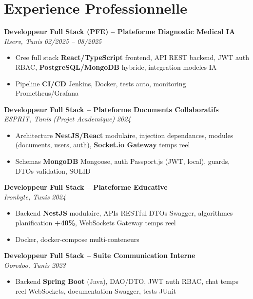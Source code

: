 \documentclass[10pt,a4paper]{article}
\begin{document}
\section*{Experience Professionnelle}
{\small

\textbf{Developpeur Full Stack (PFE) -- Plateforme Diagnostic Medical IA}\\[1pt]
\textit{Itserv, Tunis} \hfill \textit{02/2025 -- 08/2025}
\begin{itemize}[leftmargin=12pt,itemsep=2pt,topsep=3pt,parsep=0pt]
  \item Cree full stack \textbf{React/TypeScript} frontend, API REST backend, JWT auth RBAC, \textbf{PostgreSQL/MongoDB} hybride, integration modeles IA
  \item Pipeline \textbf{CI/CD} Jenkins, Docker, tests auto, monitoring Prometheus/Grafana
\end{itemize}

\vspace{3pt}
\textbf{Developpeur Full Stack -- Plateforme Documents Collaboratifs}\\[1pt]
\textit{ESPRIT, Tunis (Projet Academique)} \hfill \textit{2024}
\begin{itemize}[leftmargin=12pt,itemsep=2pt,topsep=3pt,parsep=0pt]
  \item Architecture \textbf{NestJS/React} modulaire, injection dependances, modules (documents, users, auth), \textbf{Socket.io Gateway} temps reel
  \item Schemas \textbf{MongoDB} Mongoose, auth Passport.js (JWT, local), guards, DTOs validation, SOLID
\end{itemize}

\vspace{3pt}
\textbf{Developpeur Full Stack -- Plateforme Educative}\\[1pt]
\textit{Ironbyte, Tunis} \hfill \textit{2024}
\begin{itemize}[leftmargin=12pt,itemsep=2pt,topsep=3pt,parsep=0pt]
  \item Backend \textbf{NestJS} modulaire, APIs RESTful DTOs Swagger, algorithmes planification \textbf{+40\%}, WebSockets Gateway temps reel
  \item Docker, docker-compose multi-conteneurs
\end{itemize}

\vspace{3pt}
\textbf{Developpeur Full Stack -- Suite Communication Interne}\\[1pt]
\textit{Ooredoo, Tunis} \hfill \textit{2023}
\begin{itemize}[leftmargin=12pt,itemsep=2pt,topsep=3pt,parsep=0pt]
  \item Backend \textbf{Spring Boot} (Java), DAO/DTO, JWT auth RBAC, chat temps reel WebSockets, documentation Swagger, tests JUnit
\end{itemize}

}
\end{document}
